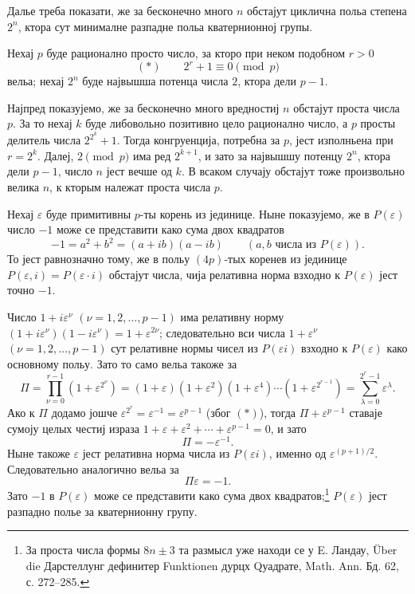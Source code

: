 ﻿\documentclass[11pt]{article}
\begin{document}
\noindent Далье треба показати, же за бесконечно много $n$ обстајут циклична польа степена $2^n$, ктора сут минималне разпадне польа кватернионној групы.

\medskip

\noindent Нехај $p$ буде рационално просто число, за кторо при неком подобном $r>0$
\[
        (*)\qquad 2^r+1\equiv0\pmod p
\]
вельа; нехај $2^n$ буде највышша потенца числа $2$, ктора дели $p-1$.

Најпред показујемо, же за бесконечно много вредностиј $n$ обстајут проста числа $p$. За то нехај $k$ буде либовольно позитивно цело рационално число, а $p$ просты делитель числа $2^{2^k}+1$. Тогда конгруенција, потребна за $p$, јест изполньена при $r=2^k$. Далеј, $2\pmod p$ има ред $2^{k+1}$, и зато за највышшу потенцу $2^n$, ктора дели $p-1$, число $n$ јест вечше од $k$. В всаком случају обстајут тоже произвольно велика $n$, к кторым належат проста числа $p$.

Нехај $\varepsilon$ буде примитивны $p$-ты корень из јединице. Ныне показујемо, же в $P(\varepsilon)$ число $-1$ може се представити како сума двох квадратов
\[
        -1=a^2+b^2=(a+ib)(a-ib)\qquad (a,b\text{ числа из }P(\varepsilon)).
\]
То јест равнозначно тому, же в польу $(4p)$-тых коренев из јединице $P(\varepsilon,i)=P(\varepsilon\cdot i)$ обстајут числа, чија релативна норма взходно к $P(\varepsilon)$ јест точно $-1$.

Число $1+i\varepsilon^\nu$ $(\nu=1,2,\ldots,p-1)$ има релативну норму $(1+i\varepsilon^\nu)(1-i\varepsilon^\nu)=1+\varepsilon^{2\nu}$; следовательно вси числа $1+\varepsilon^\nu$ $(\nu=1,2,\ldots,p-1)$ сут релативне нормы чисел из $P(\varepsilon i)$ взходно к $P(\varepsilon)$ како основному польу. Зато то само вельа такоже за
\[
\Pi=\prod_{\nu=0}^{r-1}(1+\varepsilon^{2^\nu})
=(1+\varepsilon)(1+\varepsilon^2)(1+\varepsilon^4)\cdots(1+\varepsilon^{2^{r-1}})
=\sum_{\lambda=0}^{2^r-1}\varepsilon^\lambda.
\]
Ако к $\Pi$ додамо јошче $\varepsilon^{2^r}=\varepsilon^{-1}=\varepsilon^{p-1}$ (због $(*)$), тогда $\Pi+\varepsilon^{p-1}$ ставаје сумоју целых честиј израза $1+\varepsilon+\varepsilon^2+\cdots+\varepsilon^{p-1}=0$, и зато
\[
        \Pi=-\varepsilon^{-1}.
\]
Ныне такоже $\varepsilon$ јест релативна норма числа из $P(\varepsilon i)$, именно од $\varepsilon^{(p+1)/2}$. Следовательно аналогично вельа за
\[
        \Pi\varepsilon=-1.
\]
Зато $-1$ в $P(\varepsilon)$ може се представити како сума двох квадратов;\footnote{За проста числа формы $8n\pm3$ та размысл уже находи се у E. Ландау, Über die Дарстеллунг дефинитер Funktionen дурцх Qуадрате, Math. Ann. Бд. 62, с. 272--285.} $P(\varepsilon)$ јест разпадно полье за кватернионну групу.
\end{document}
